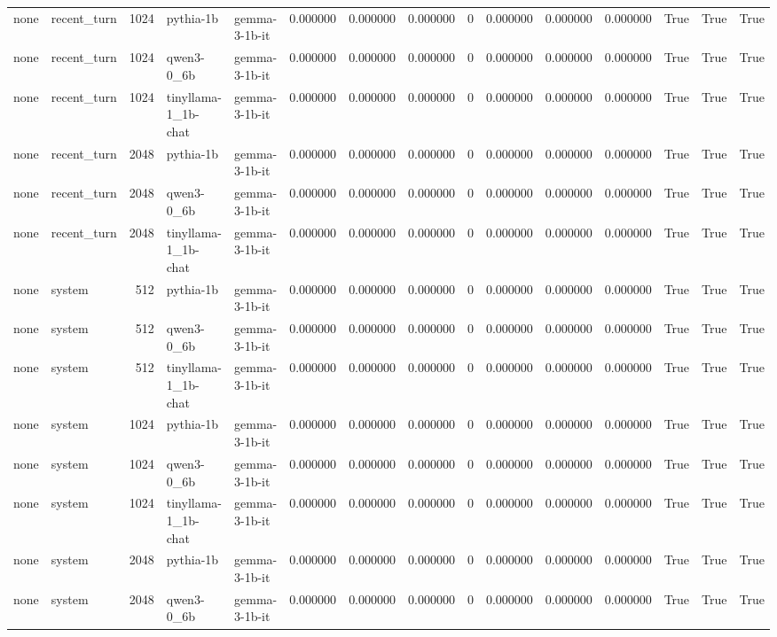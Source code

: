 \begin{tabular}{llrllrrrrrrrrrr}
none & recent_turn & 1024 & pythia-1b & gemma-3-1b-it & 0.000000 & 0.000000 & 0.000000 & 0 & 0.000000 & 0.000000 & 0.000000 & True & True & True \\
none & recent_turn & 1024 & qwen3-0_6b & gemma-3-1b-it & 0.000000 & 0.000000 & 0.000000 & 0 & 0.000000 & 0.000000 & 0.000000 & True & True & True \\
none & recent_turn & 1024 & tinyllama-1_1b-chat & gemma-3-1b-it & 0.000000 & 0.000000 & 0.000000 & 0 & 0.000000 & 0.000000 & 0.000000 & True & True & True \\
none & recent_turn & 2048 & pythia-1b & gemma-3-1b-it & 0.000000 & 0.000000 & 0.000000 & 0 & 0.000000 & 0.000000 & 0.000000 & True & True & True \\
none & recent_turn & 2048 & qwen3-0_6b & gemma-3-1b-it & 0.000000 & 0.000000 & 0.000000 & 0 & 0.000000 & 0.000000 & 0.000000 & True & True & True \\
none & recent_turn & 2048 & tinyllama-1_1b-chat & gemma-3-1b-it & 0.000000 & 0.000000 & 0.000000 & 0 & 0.000000 & 0.000000 & 0.000000 & True & True & True \\
none & system & 512 & pythia-1b & gemma-3-1b-it & 0.000000 & 0.000000 & 0.000000 & 0 & 0.000000 & 0.000000 & 0.000000 & True & True & True \\
none & system & 512 & qwen3-0_6b & gemma-3-1b-it & 0.000000 & 0.000000 & 0.000000 & 0 & 0.000000 & 0.000000 & 0.000000 & True & True & True \\
none & system & 512 & tinyllama-1_1b-chat & gemma-3-1b-it & 0.000000 & 0.000000 & 0.000000 & 0 & 0.000000 & 0.000000 & 0.000000 & True & True & True \\
none & system & 1024 & pythia-1b & gemma-3-1b-it & 0.000000 & 0.000000 & 0.000000 & 0 & 0.000000 & 0.000000 & 0.000000 & True & True & True \\
none & system & 1024 & qwen3-0_6b & gemma-3-1b-it & 0.000000 & 0.000000 & 0.000000 & 0 & 0.000000 & 0.000000 & 0.000000 & True & True & True \\
none & system & 1024 & tinyllama-1_1b-chat & gemma-3-1b-it & 0.000000 & 0.000000 & 0.000000 & 0 & 0.000000 & 0.000000 & 0.000000 & True & True & True \\
none & system & 2048 & pythia-1b & gemma-3-1b-it & 0.000000 & 0.000000 & 0.000000 & 0 & 0.000000 & 0.000000 & 0.000000 & True & True & True \\
none & system & 2048 & qwen3-0_6b & gemma-3-1b-it & 0.000000 & 0.000000 & 0.000000 & 0 & 0.000000 & 0.000000 & 0.000000 & True & True & True \\

\end{tabular}
